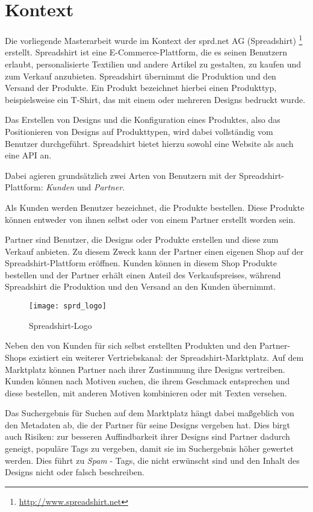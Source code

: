 \section{Kontext}   
\label{spreadshirt}

Die vorliegende Masterarbeit wurde im Kontext der sprd.net AG (Spreadshirt) \footnote{\url{http://www.spreadshirt.net}} erstellt. Spreadshirt ist eine E-Commerce-Plattform, die es seinen Benutzern erlaubt, personalisierte Textilien und andere Artikel zu gestalten, zu kaufen und zum Verkauf anzubieten. Spreadshirt übernimmt die Produktion und den Versand der Produkte. Ein Produkt bezeichnet hierbei einen Produkttyp, beispielsweise ein T-Shirt, das mit einem oder mehreren Designs bedruckt wurde.

Das Erstellen von Designs und die Konfiguration eines Produktes, also das Positionieren von Designs auf Produkttypen, wird dabei vollständig vom Benutzer durchgeführt. Spreadshirt bietet hierzu sowohl eine Website als auch eine API an.

Dabei agieren grundsätzlich zwei Arten von Benutzern mit der Spreadshirt-Plattform: \emph{Kunden} und \emph{Partner}.

Als Kunden werden Benutzer bezeichnet, die Produkte bestellen. Diese Produkte können entweder von ihnen selbst oder von einem Partner erstellt worden sein. 

Partner sind Benutzer, die Designs oder Produkte erstellen und diese zum Verkauf anbieten. Zu diesem Zweck kann der Partner einen eigenen Shop auf der Spreadshirt-Plattform eröffnen. Kunden können in diesem Shop Produkte bestellen und der Partner erhält einen Anteil des Verkaufspreises, während Spreadshirt die Produktion und den Versand an den Kunden übernimmt.

\begin{figure}
\label{fig:logo}
\begin{center}
    \texttt{[image: sprd\_logo]}
\end{center}
\caption{Spreadshirt-Logo}
\end{figure}

Neben den von Kunden für sich selbst erstellten Produkten und den Partner-Shops existiert ein weiterer Vertriebskanal: der Spreadshirt-Marktplatz. Auf dem Marktplatz können Partner nach ihrer Zustimmung ihre Designs vertreiben. Kunden können nach Motiven suchen, die ihrem Geschmack entsprechen und diese bestellen, mit anderen Motiven kombinieren oder mit Texten versehen.

Das Suchergebnis für Suchen auf dem Marktplatz hängt dabei maßgeblich von den Metadaten ab, die der Partner für seine Designs vergeben hat. Dies birgt auch Risiken: zur besseren Auffindbarkeit ihrer Designs sind Partner dadurch geneigt, populäre Tags zu vergeben, damit sie im Suchergebnis höher gewertet werden. Dies führt zu \emph{Spam} - Tags, die nicht erwünscht sind und den Inhalt des Designs nicht oder falsch beschreiben.


